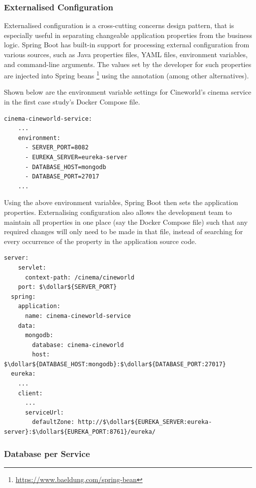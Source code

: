 \subsubsection{Externalised Configuration}

Externalised configuration is a cross-cutting concerns design pattern, that is especially useful in separating changeable application properties from the business logic. Spring Boot has built-in support for processing external configuration from various sources, such as Java properties files, YAML files, environment variables, and command-line arguments. The values set by the developer for such properties are injected into Spring beans \footnote{\url{https://www.baeldung.com/spring-bean}} using the  annotation (among other alternatives).

Shown below are the environment variable settings for Cineworld's cinema service in the first case study's Docker Compose file.
\begin{lstlisting}[caption=Snippet from \code{docker-compose.yml}]
  cinema-cineworld-service:
    ...
    environment:
      - SERVER_PORT=8082
      - EUREKA_SERVER=eureka-server
      - DATABASE_HOST=mongodb
      - DATABASE_PORT=27017
    ...
\end{lstlisting}

Using the above environment variables, Spring Boot then sets the application properties. Externalising configuration also allows the development team to maintain all properties in one place (say the Docker Compose file) such that any required changes will only need to be made in that file, instead of searching for every occurrence of the property in the application source code.

\begin{lstlisting}[caption=Snippet from \code{cinema-cineworld-service} \code{application.yml} file]
  server:
    servlet:
      context-path: /cinema/cineworld
    port: $\dollar${SERVER_PORT}
  spring:
    application:
      name: cinema-cineworld-service
    data:
      mongodb:
        database: cinema-cineworld
        host: $\dollar${DATABASE_HOST:mongodb}:$\dollar${DATABASE_PORT:27017}
  eureka:
    ...
    client:
      ...
      serviceUrl:
        defaultZone: http://$\dollar${EUREKA_SERVER:eureka-server}:$\dollar${EUREKA_PORT:8761}/eureka/
\end{lstlisting}

\subsubsection{Database per Service}

